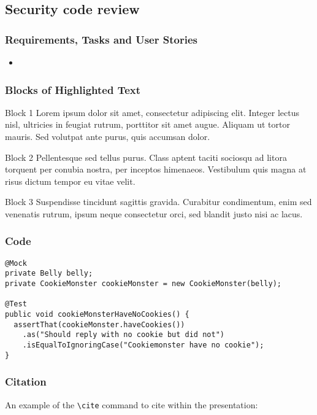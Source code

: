\documentclass{beamer}
\begin{document}
\begin{frame}
\subsection{Security code review}
\begin{frame}
\frametitle{Requirements, Tasks and User Stories}
\begin{itemize}
\item
\end{itemize}
\end{frame}

\iffalse
\begin{frame}
\frametitle{Blocks of Highlighted Text}
\begin{block}{Block 1}
Lorem ipsum dolor sit amet, consectetur adipiscing elit. Integer lectus nisl, ultricies in feugiat rutrum, porttitor sit amet augue. Aliquam ut tortor mauris. Sed volutpat ante purus, quis accumsan dolor.
\end{block}

\begin{block}{Block 2}
Pellentesque sed tellus purus. Class aptent taciti sociosqu ad litora torquent per conubia nostra, per inceptos himenaeos. Vestibulum quis magna at risus dictum tempor eu vitae velit.
\end{block}

\begin{block}{Block 3}
Suspendisse tincidunt sagittis gravida. Curabitur condimentum, enim sed venenatis rutrum, ipsum neque consectetur orci, sed blandit justo nisi ac lacus.
\end{block}
\end{frame}

\begin{frame}[fragile]
\frametitle{Code}
\begin{example}[Code]
\begin{lstlisting}
@Mock
private Belly belly;
private CookieMonster cookieMonster = new CookieMonster(belly);

@Test
public void cookieMonsterHaveNoCookies() {
  assertThat(cookieMonster.haveCookies())
    .as("Should reply with no cookie but did not")
    .isEqualToIgnoringCase("Cookiemonster have no cookie");
}
\end{lstlisting}
\end{example}
\end{frame}

\begin{frame}[fragile] %
\frametitle{Citation}
An example of the \verb|\cite| command to cite within the presentation:\\~


\end{frame}
\end{frame}
\end{document}
